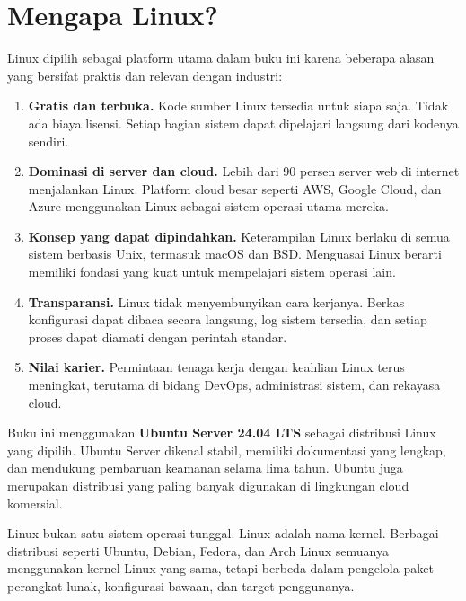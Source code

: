 \section{Mengapa Linux?}
\label{sec:why-linux}

Linux dipilih sebagai platform utama dalam buku ini karena beberapa alasan yang bersifat
praktis dan relevan dengan industri:

\begin{enumerate}
    \item \textbf{Gratis dan terbuka.} Kode sumber Linux tersedia untuk siapa saja.
    Tidak ada biaya lisensi. Setiap bagian sistem dapat dipelajari langsung dari
    kodenya sendiri.

    \item \textbf{Dominasi di server dan cloud.} Lebih dari 90 persen server web di
    internet menjalankan Linux. Platform cloud besar seperti AWS, Google Cloud, dan Azure
    menggunakan Linux sebagai sistem operasi utama mereka.

    \item \textbf{Konsep yang dapat dipindahkan.} Keterampilan Linux berlaku di semua
    sistem berbasis Unix, termasuk macOS dan BSD. Menguasai Linux berarti memiliki
    fondasi yang kuat untuk mempelajari sistem operasi lain.

    \item \textbf{Transparansi.} Linux tidak menyembunyikan cara kerjanya. Berkas
    konfigurasi dapat dibaca secara langsung, log sistem tersedia, dan setiap proses
    dapat diamati dengan perintah standar.

    \item \textbf{Nilai karier.} Permintaan tenaga kerja dengan keahlian Linux terus
    meningkat, terutama di bidang DevOps, administrasi sistem, dan rekayasa cloud.
\end{enumerate}

Buku ini menggunakan \textbf{Ubuntu Server 24.04 LTS} sebagai distribusi Linux yang
dipilih. Ubuntu Server dikenal stabil, memiliki dokumentasi yang lengkap, dan mendukung
pembaruan keamanan selama lima tahun. Ubuntu juga merupakan distribusi yang paling banyak
digunakan di lingkungan cloud komersial.

\begin{notebox}
Linux bukan satu sistem operasi tunggal. Linux adalah nama kernel. Berbagai distribusi
seperti Ubuntu, Debian, Fedora, dan Arch Linux semuanya menggunakan kernel Linux yang
sama, tetapi berbeda dalam pengelola paket perangkat lunak, konfigurasi bawaan, dan
target penggunanya.
\end{notebox}

